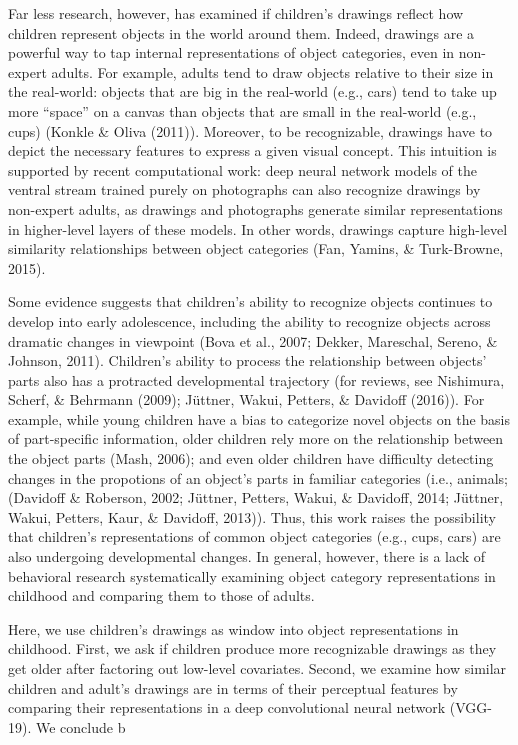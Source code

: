 \documentclass[10pt, letterpaper]{article}
\begin{document}
Far less research, however, has examined if children's drawings reflect
how children represent objects in the world around them. Indeed,
drawings are a powerful way to tap internal representations of object
categories, even in non-expert adults. For example, adults tend to draw
objects relative to their size in the real-world: objects that are big
in the real-world (e.g., cars) tend to take up more ``space'' on a
canvas than objects that are small in the real-world (e.g., cups)
(Konkle \& Oliva (2011)). Moreover, to be recognizable, drawings have to
depict the necessary features to express a given visual concept. This
intuition is supported by recent computational work: deep neural network
models of the ventral stream trained purely on photographs can also
recognize drawings by non-expert adults, as drawings and photographs
generate similar representations in higher-level layers of these models.
In other words, drawings capture high-level similarity relationships
between object categories (Fan, Yamins, \& Turk-Browne, 2015).

Some evidence suggests that children's ability to recognize objects
continues to develop into early adolescence, including the ability to
recognize objects across dramatic changes in viewpoint (Bova et al.,
2007; Dekker, Mareschal, Sereno, \& Johnson, 2011). Children's ability
to process the relationship between objects' parts also has a protracted
developmental trajectory (for reviews, see Nishimura, Scherf, \&
Behrmann (2009); Jüttner, Wakui, Petters, \& Davidoff (2016)). For
example, while young children have a bias to categorize novel objects on
the basis of part-specific information, older children rely more on the
relationship between the object parts (Mash, 2006); and even older
children have difficulty detecting changes in the propotions of an
object's parts in familiar categories (i.e., animals; (Davidoff \&
Roberson, 2002; Jüttner, Petters, Wakui, \& Davidoff, 2014; Jüttner,
Wakui, Petters, Kaur, \& Davidoff, 2013)). Thus, this work raises the
possibility that children's representations of common object categories
(e.g., cups, cars) are also undergoing developmental changes. In
general, however, there is a lack of behavioral research systematically
examining object category representations in childhood and comparing
them to those of adults.

Here, we use children's drawings as window into object representations
in childhood. First, we ask if children produce more recognizable
drawings as they get older after factoring out low-level covariates.
Second, we examine how similar children and adult's drawings are in
terms of their perceptual features by comparing their representations in
a deep convolutional neural network (VGG-19). We conclude b
\end{document}
